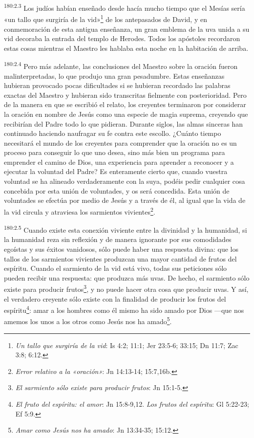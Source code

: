 \par 
\textsuperscript{180:2.3} Los judíos habían enseñado desde hacía mucho tiempo que el Mesías sería «un tallo que surgiría de la vid»\footnote{\textit{Un tallo que surgiría de la vid}: Is 4:2; 11:1; Jer 23:5-6; 33:15; Dn 11:7; Zac 3:8; 6:12.} de los antepasados de David, y en conmemoración de esta antigua enseñanza, un gran emblema de la uva unida a su vid decoraba la entrada del templo de Herodes. Todos los apóstoles recordaron estas cosas mientras el Maestro les hablaba esta noche en la habitación de arriba.

\par 
\textsuperscript{180:2.4} Pero más adelante, las conclusiones del Maestro sobre la oración fueron malinterpretadas, lo que produjo una gran pesadumbre. Estas enseñanzas hubieran provocado pocas dificultades si se hubieran recordado las palabras exactas del Maestro y hubieran sido transcritas fielmente con posterioridad. Pero de la manera en que se escribió el relato, los creyentes terminaron por considerar la oración en nombre de Jesús como una especie de magia suprema, creyendo que recibirían del Padre todo lo que pidieran. Durante siglos, las almas sinceras han continuado haciendo naufragar su fe contra este escollo. ¿Cuánto tiempo necesitará el mundo de los creyentes para comprender que la oración no es un proceso para conseguir lo que uno desea, sino más bien un programa para emprender el camino de Dios, una experiencia para aprender a reconocer y a ejecutar la voluntad del Padre? Es enteramente cierto que, cuando vuestra voluntad se ha alineado verdaderamente con la suya, podéis pedir cualquier cosa concebida por esta unión de voluntades, y os será concedida. Esta unión de voluntades se efectúa por medio de Jesús y a través de él, al igual que la vida de la vid circula y atraviesa los sarmientos vivientes\footnote{\textit{Error relativo a la «oración»}: Jn 14:13-14; 15:7,16b.}.

\par 
\textsuperscript{180:2.5} Cuando existe esta conexión viviente entre la divinidad y la humanidad, si la humanidad reza sin reflexión y de manera ignorante por sus comodidades egoístas y sus éxitos vanidosos, sólo puede haber una respuesta divina: que los tallos de los sarmientos vivientes produzcan una mayor cantidad de frutos del espíritu. Cuando el sarmiento de la vid está vivo, todas sus peticiones sólo pueden recibir una respuesta: que produzca más uvas. De hecho, el sarmiento sólo existe para producir frutos\footnote{\textit{El sarmiento sólo existe para producir frutos}: Jn 15:1-5.}, y no puede hacer otra cosa que producir uvas. Y así, el verdadero creyente sólo existe con la finalidad de producir los frutos del espíritu\footnote{\textit{El fruto del espíritu: el amor}: Jn 15:8-9,12. \textit{Los frutos del espíritu}: Gl 5:22-23; Ef 5:9.}: amar a los hombres como él mismo ha sido amado por Dios ---que nos amemos los unos a los otros como Jesús nos ha amado\footnote{\textit{Amar como Jesús nos ha amado}: Jn 13:34-35; 15:12.}.


